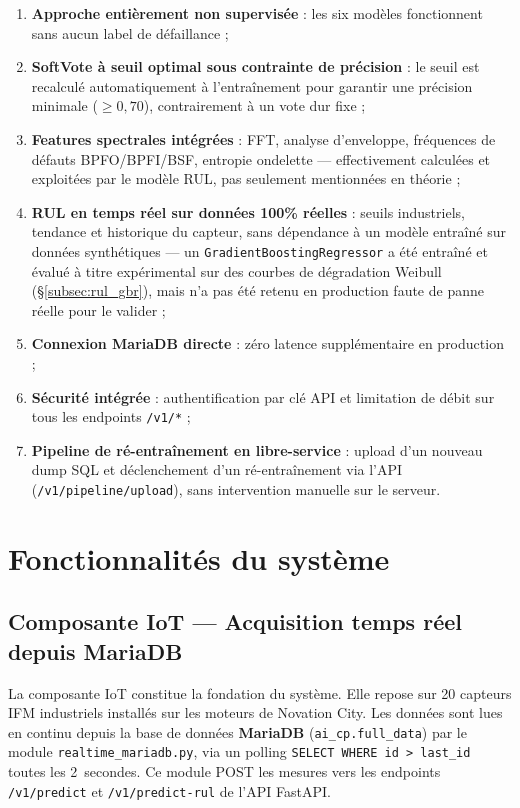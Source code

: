 \documentclass[12pt,a4paper]{report}
\begin{document}
\begin{enumerate}
  \item \textbf{Approche entièrement non supervisée} : les six modèles fonctionnent sans aucun label de défaillance ;
  \item \textbf{SoftVote à seuil optimal sous contrainte de précision} : le seuil est recalculé automatiquement à l'entraînement pour garantir une précision minimale ($\geq 0{,}70$), contrairement à un vote dur fixe ;
  \item \textbf{Features spectrales intégrées} : FFT, analyse d'enveloppe, fréquences de défauts BPFO/BPFI/BSF, entropie ondelette — effectivement calculées et exploitées par le modèle RUL, pas seulement mentionnées en théorie ;
  \item \textbf{RUL en temps réel sur données 100\% réelles} : seuils industriels, tendance et historique du capteur, sans dépendance à un modèle entraîné sur données synthétiques — un \texttt{GradientBoostingRegressor} a été entraîné et évalué à titre expérimental sur des courbes de dégradation Weibull (\S\ref{subsec:rul_gbr}), mais n'a pas été retenu en production faute de panne réelle pour le valider ;
  \item \textbf{Connexion MariaDB directe} : zéro latence supplémentaire en production ;
  \item \textbf{Sécurité intégrée} : authentification par clé API et limitation de débit sur tous les endpoints \texttt{/v1/*} ;
  \item \textbf{Pipeline de ré-entraînement en libre-service} : upload d'un nouveau dump SQL et déclenchement d'un ré-entraînement via l'API (\texttt{/v1/pipeline/upload}), sans intervention manuelle sur le serveur.
\end{enumerate}

\section{Fonctionnalités du système}

\subsection{Composante IoT — Acquisition temps réel depuis MariaDB}

La composante IoT constitue la fondation du système. Elle repose sur 20 capteurs IFM
industriels installés sur les moteurs de Novation City. Les données sont lues en continu
depuis la base de données \textbf{MariaDB} (\texttt{ai\_cp.full\_data}) par le module
\texttt{realtime\_mariadb.py}, via un polling \texttt{SELECT WHERE id > last\_id} toutes
les 2~secondes. Ce module POST les mesures vers les endpoints \texttt{/v1/predict} et
\texttt{/v1/predict-rul} de l'API FastAPI.
\end{document}
